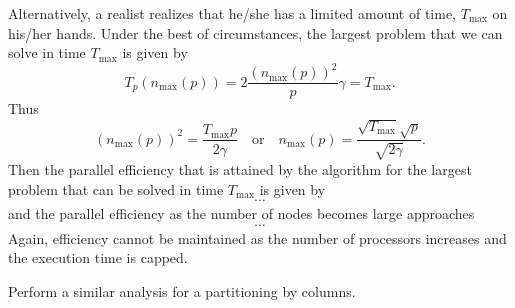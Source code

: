 Alternatively, a realist realizes that he/she has a limited amount of time,
$ T_{\mbox{max}} $ on
his/her hands.  Under the best of circumstances, the largest problem
that we can solve in time $ T_{\mbox{max}} $ is given by
\[ 
T_p(n_{\mbox{max}}(p)) = 2 \frac{(n_{\mbox{max}}(p))^2}{p} \gamma = T_{\mbox{max}} .
\]
Thus
\[
(n_{\mbox{max}}(p))^2 = \frac{T_{\mbox{max}} p}{2 \gamma}
\quad
\mbox{or}
\quad
n_{\mbox{max}}(p) = \frac{\sqrt{T_{\mbox{max}}} \sqrt{p}}{\sqrt{2 \gamma}}.
\]
Then the parallel efficiency that is attained by the algorithm for the largest
problem that can be solved in time $ T_{\mbox{max}} $ is given by
\[
~
\cdots
~\]
and the parallel efficiency as the number of nodes becomes large approaches
\[
~
\cdots
~
\]
Again, efficiency cannot be maintained as the number of processors increases and the execution time is capped.

\begin{exercise}
  Perform a similar analysis for a partitioning by columns.
\end{exercise}

